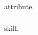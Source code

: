 \begin{tcbposter}
{  \subsubsection{}
  \glsdesc{attribute}.
  \par
  \vspace{1em}
  \subsubsection{}
  \glsdesc{skill}.
}

\end{tcbposter}


